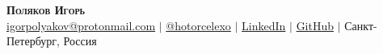 \documentclass[letterpaper,11pt]{article}
\begin{document}
\begin{center}
  \textbf{\Huge \scshape Поляков Игорь} \\ \vspace{3pt}
    \small
    \faAt \hspace{.5pt} \href{mailto:igorpolyakov@protonmail.com}{igorpolyakov@protonmail.com}
    $|$
    \faTelegram \hspace{.5pt} \href{https://t.me/hotorcelexo}{@hotorcelexo}
    $|$
    \faLinkedinIn \hspace{.5pt} \href{https://www.linkedin.com/in/polyakov-igor-b63497133/}{LinkedIn}
    $|$
    \faGithub \hspace{.5pt} \href{https://github.com/IgorPolyakov}{GitHub}
    $|$
    \faMapPin \hspace{.5pt} Санкт-Петербург, Россия
\end{center}

\end{document}
